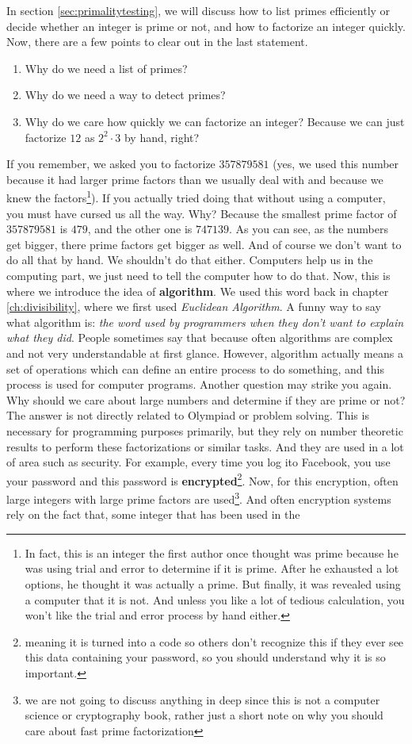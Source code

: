 \documentclass{subfiles}
\begin{document}
	In section \eqref{sec:primalitytesting}, we will discuss how to list primes efficiently or decide whether an integer is prime or not, and how to factorize an integer quickly. Now, there are a few points to clear out in the last statement.
		\begin{enumerate}
			\item Why do we need a list of primes?
			\item Why do we need a way to detect primes?
			\item Why do we care how quickly we can factorize an integer? Because we can just factorize $12$ as $2^2\cdot3$ by hand, right?
		\end{enumerate}
	If you remember, we asked you to factorize $357879581$ (yes, we used this number because it had larger prime factors than we usually deal with and because we knew the factors\footnote{In fact, this is an integer the first author once thought was prime because he was using trial and error to determine if it is prime. After he exhausted a lot options, he thought it was actually a prime. But finally, it was revealed using a computer that it is not. And unless you like a lot of tedious calculation, you won't like the trial and error process by hand either.}). If you actually tried doing that without using a computer, you must have cursed us all the way. Why? Because the smallest prime factor of $357879581$ is $479$, and the other one is $747139$. As you can see, as the numbers get bigger, there prime factors get bigger as well. And of course we don't want to do all that by hand. We shouldn't do that either. Computers help us in the computing part, we just need to tell the computer how to do that. Now, this is where we introduce the idea of \textbf{algorithm}. We used this word back in chapter \eqref{ch:divisibility}, where we first used \textit{Euclidean Algorithm}. A funny way to say what algorithm is: \textit{the word used by programmers when they don't want to explain what they did}. People sometimes say that because often algorithms are complex and not very understandable at first glance. However, algorithm actually means a set of operations which can define an entire process to do something, and this process is used for computer programs. Another question may strike you again. Why should we care about large numbers and determine if they are prime or not? The answer is not directly related to Olympiad or problem solving. This is necessary for programming purposes primarily, but they rely on number theoretic results to perform these factorizations or similar tasks. And they are used in a lot of area such as security. For example, every time you log ito Facebook, you use your password and this password is \textbf{encrypted}\footnote{meaning it is turned into a code so others don't recognize this if they ever see this data containing your password, so you should understand why it is so important.}. Now, for this encryption, often large integers with large prime factors are used\footnote{we are not going to discuss anything in deep since this is not a computer science or cryptography book, rather just a short note on why you should care about fast prime factorization}. And often encryption systems rely on the fact that, some integer that has been used in the 
\end{document}

